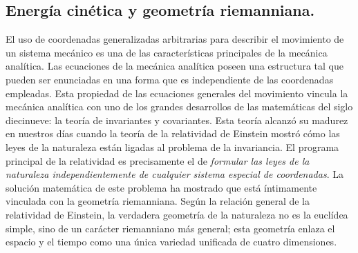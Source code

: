 \documentclass[12pt,a4paper]{book}
\begin{document}
\begin{center}

\section{Energ\'ia cin\'etica y geometr\'ia riemanniana.}

El uso de coordenadas generalizadas arbitrarias para describir el movimiento de un sistema mec\'anico es una de las caracter\'isticas principales de la mec\'anica anal\'itica. Las ecuaciones de la mec\'anica anal\'itica poseen una estructura tal que pueden ser enunciadas en una forma que es independiente de las coordenadas empleadas. Esta propiedad de las ecuaciones generales del movimiento vincula la mec\'anica anal\'itica con uno de los grandes desarrollos de las matem\'aticas del siglo diecinueve: la teor\'ia de invariantes y covariantes. Esta teor\'ia alcanz\'o su madurez en nuestros d\'ias cuando la teor\'ia de la relatividad de Einstein mostr\'o c\'omo las leyes de la naturaleza est\'an ligadas al problema de la invariancia. El programa principal de la relatividad es precisamente el de \textit{formular las leyes de la naturaleza independientemente de cualquier sistema especial de coordenadas}. La soluci\'on matem\'atica de este problema ha mostrado que est\'a \'intimamente vinculada con la geometr\'ia riemanniana. Seg\'un la relaci\'on general de la relatividad de Einstein, la verdadera geometr\'ia de la naturaleza no es la eucl\'idea simple, sino de un car\'acter riemanniano m\'as general; esta geometr\'ia enlaza el espacio y el tiempo como una \'unica variedad unificada de cuatro dimensiones.



\end{center}
\end{document}
